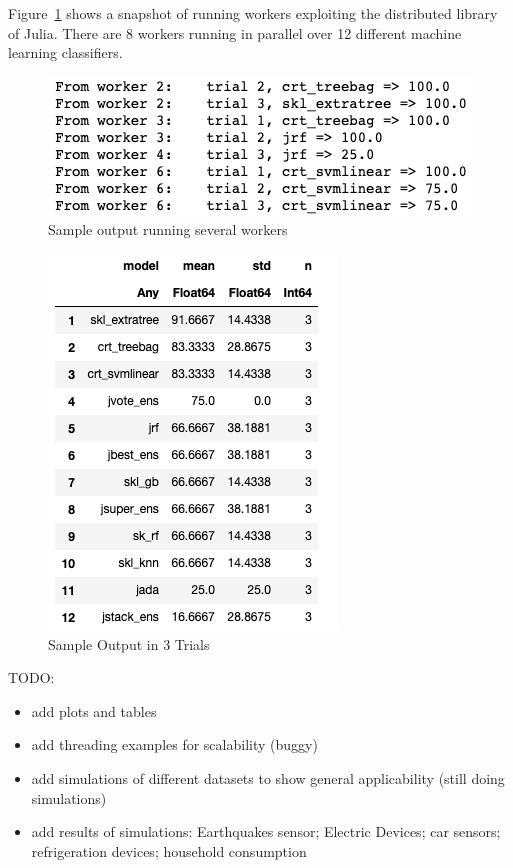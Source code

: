 \documentclass{juliacon}
\begin{document}
Figure~\ref{fig:sim}  shows a snapshot of running workers exploiting the distributed library of Julia. There are 8 workers running in parallel over 12 different machine learning classifiers.

\begin{figure}[htbp]
   \centering
   \includegraphics[width=0.8\columnwidth]{sim.png} %
   \caption{Sample output running several workers}
   \label{fig:sim}
\end{figure}

\begin{figure}[htbp]
   \centering
   \includegraphics[width=0.6\columnwidth]{results.png} %
   \caption{Sample Output in 3 Trials}
   \label{fig:performance}
\end{figure}

TODO: 
\begin{itemize}
\item add plots and tables
\item add threading examples for scalability (buggy)
\item add simulations of different datasets to show general applicability (still doing simulations)
\item add results of simulations: Earthquakes sensor; Electric Devices; car sensors; refrigeration devices; household consumption
\end{itemize}

%
%


\end{document}
